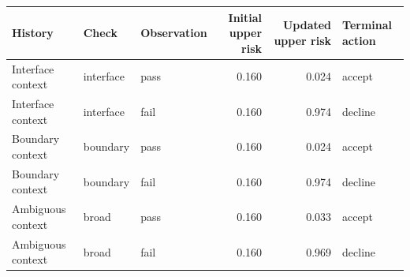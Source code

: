 \begin{tabular}{@{}lllrrl@{}}
\toprule
History & Check & Observation & Initial upper risk & Updated upper risk & Terminal action\\
\midrule
Interface context & interface & pass & 0.160 & 0.024 & accept\\
Interface context & interface & fail & 0.160 & 0.974 & decline\\
Boundary context & boundary & pass & 0.160 & 0.024 & accept\\
Boundary context & boundary & fail & 0.160 & 0.974 & decline\\
Ambiguous context & broad & pass & 0.160 & 0.033 & accept\\
Ambiguous context & broad & fail & 0.160 & 0.969 & decline\\
\bottomrule
\end{tabular}
